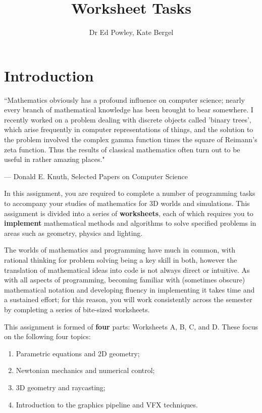 \documentclass{../../fal_assignment}
\title{Worksheet Tasks}
\author{Dr Ed Powley, Kate Bergel}
\begin{document}
\maketitle

\section*{Introduction}

\begin{marginquote}
``Mathematics obviously has a profound influence on computer science; nearly every branch of mathematical knowledge has been brought to bear somewhere. I recently worked on a problem dealing with discrete objects called 'binary trees', which arise frequently in computer representations of things, and the solution to the problem involved the complex gamma function times the square of  Reimann's zeta function. Thus the results of classical mathematics often turn out to be useful in rather amazing places."

\par --- Donald E. Knuth, Selected Papers on Computer Science
\end{marginquote}

In this assignment, you are required to complete a number of programming tasks to accompany your studies of mathematics for 3D worlds and simulations. This assignment is divided into a series of \textbf{worksheets}, each of which requires you to \textbf{implement} mathematical methods and algorithms to solve specified problems in areas such as geometry, physics and lighting.

The worlds of mathematics and programming have much in common, with rational thinking for problem solving being a key skill in both, however the translation of mathematical ideas into code is not always direct or intuitive. As with all aspects of programming, becoming familiar with (sometimes obscure) mathematical notation and developing fluency in implementing it takes time and a sustained effort; for this reason, you will work consistently across the semester by completing a series of bite-sized worksheets.

This assignment is formed of \textbf{four} parts: Worksheets A, B, C, and D.
These focus on the following four topics:
\begin{enumerate}[label=\textbf{\Alph*},align=left]
	\item Parametric equations and 2D geometry;
	\item Newtonian mechanics and numerical control;
	\item 3D geometry and raycasting;
	\item Introduction to the graphics pipeline and VFX techniques.
\end{enumerate}
\end{document}
